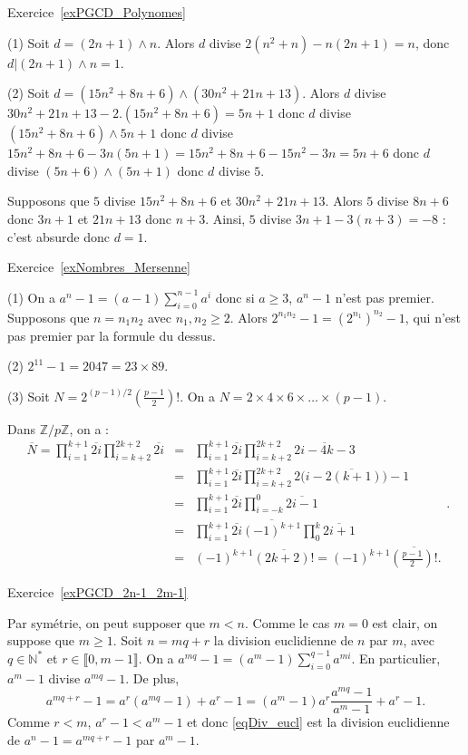 \documentclass[11pt,a4paper]{article}
\newcommand{\N}{\mathbb{N}}
\newcommand{\Z}{\mathbb{Z}}
\begin{document}
Exercice~\ref{exPGCD_Polynomes}

(1) Soit $d=(2n+1)\wedge n$. Alors $d$ divise $2(n^2+n)-n(2n+1)=n$, donc $d | (2n+1)\wedge n=1$.

(2) Soit $d=(15n^2+8n+6)\wedge (30 n^2+21n+13)$. Alors $d$ divise  $30 n^2+21n+13-2.(15 n^2+8n+6)=5n+1$ donc $d$ divise $(15 n^2+8n+6)\wedge 5n+1$ donc $d$ divise $15 n^2+8n+6-3n(5n+1)=15 n^2+8n+6-15n^2-3n=5n+6$ donc $d$ divise $(5n+6)\wedge(5n+1)$ donc $d$ divise $5$.

Supposons que $5$ divise $15n^2+8n+6$ et $30 n^2+21n+13$. Alors $5$ divise $8n+6$ donc $3n+1$ et $21n+13$ donc $n+3$. Ainsi, $5$ divise $3n+1-3(n+3)=-8$ : c'est absurde donc $d=1$. 

Exercice~\ref{exNombres_Mersenne}

(1) On a $a^n-1=(a-1)\sum_{i=0}^{n-1} a^i$ donc si $a\geq 3$, $a^n-1$ n'est pas premier. Supposons que $n=n_1n_2$ avec $n_1,n_2\geq 2$. Alors $2^{n_1n_2}-1=(2^{n_1})^{n_2}-1$, qui n'est pas premier par la formule du dessus.

(2) $2^{11}-1=2047=23\times 89$.

(3) Soit $N=2^{(p-1)/2} (\frac{p-1}{2})!$. On a $N=2\times 4\times 6\times \ldots \times (p-1)$. 

Dans $\Z/p\Z$, on a :\[\begin{aligned} \overline{N}=\prod_{i=1}^{k+1} \overline{2i}\prod_{i=k+2}^{2k+2} \overline{2i} &=&  \prod_{i=1}^{k+1} \overline{2i} \prod_{i=k+2}^{2k+2} \overline{2i-4k-3}\\
&=& \prod_{i=1}^{k+1} \overline{2i} \prod_{i=k+2}^{2k+2} \overline{2\big(i-2(k+1)\big)-1}\\
&=& \prod_{i=1}^{k+1} \overline{2i} \prod_{i=-k}^{0} \overline{2i-1}\\
&=& \prod_{i=1}^{k+1} \overline{2i}\overline{(-1)^{k+1}} \prod_{0}^{k} \overline{2i+1}\\
&=& (-1)^{k+1} \overline{(2k+2)!}=(-1)^{k+1}\overline{(\frac{p-1}{2})!}.\end{aligned}.\]

Exercice~\ref{exPGCD_2n-1_2m-1}


Par symétrie, on peut supposer que $m<n$. Comme le cas $m=0$ est clair, on suppose que $m\geq 1$.  Soit $n=mq+r$ la division euclidienne de $n$ par $m$, avec $q\in \N^*$ et $r\in \llbracket 0,m-1\rrbracket$. On a $a^{mq}-1=(a^m-1)\sum_{i=0}^{q-1} a^{mi}$. En particulier, $a^m-1$ divise $a^{mq}-1$. De plus, \begin{equation}\label{eqDiv_eucl}
a^{mq+r}-1=a^r (a^{mq}-1)+a^{r}-1=(a^{m}-1)a^{r}\frac{a^{mq}-1}{a^m-1}+a^{r}-1.
\end{equation}  
Comme $r<m$, $a^r-1<a^m-1$ et donc \eqref{eqDiv_eucl} est la division euclidienne de $a^n-1=a^{mq+r}-1$ par $a^m-1$.
\end{document}
